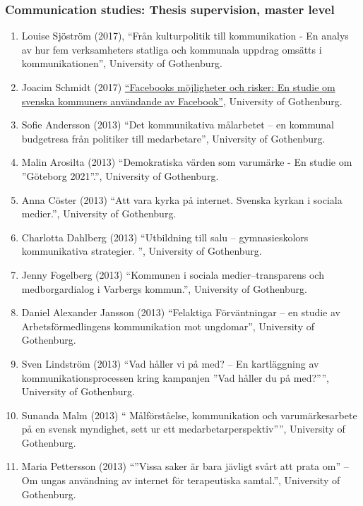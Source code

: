 \documentclass[a4paper,11pt,oneside]{article}
\begin{document}
             \subsubsection{Communication studies: Thesis supervision, master level}
             \begin{enumerate}
             \item Louise Sjöström (2017), ``Från kulturpolitik till kommunikation - En analys av hur fem verksamheters statliga och kommunala uppdrag omsätts i kommunikationen'', University of Gothenburg.
             \item Joacim Schmidt (2017) \href{https://gupea.ub.gu.se/bitstream/2077/52545/1/gupea_2077_52545_1.pdf}{``Facebooks möjligheter och risker: En studie om svenska kommuners användande av Facebook''}, University of Gothenburg.
             \item Sofie Andersson (2013) ``Det kommunikativa målarbetet – en kommunal budgetresa från politiker till medarbetare'', University of Gothenburg.
             \item Malin Arosilta (2013) ``Demokratiska värden som varumärke - En studie om ''Göteborg 2021''.'', University of Gothenburg.
             \item Anna Cöster (2013) ``Att vara kyrka på internet. Svenska kyrkan i sociala medier.'', University of Gothenburg.
             \item Charlotta Dahlberg (2013) ``Utbildning till salu – gymnasieskolors kommunikativa strategier. '', University of Gothenburg.
             \item Jenny Fogelberg (2013) ``Kommunen i sociala medier–transparens och medborgardialog i Varbergs kommun.'', University of Gothenburg.
             \item Daniel Alexander Jansson (2013) ``Felaktiga Förväntningar – en studie av Arbetsförmedlingens kommunikation mot ungdomar'', University of Gothenburg.
             \item Sven Lindström (2013) ``Vad håller vi på med? – En kartläggning av kommunikationsprocessen kring kampanjen ”Vad håller du på med?”'', University of Gothenburg.
             \item Sunanda Malm (2013) `` Målförståelse, kommunikation och varumärkesarbete på en svensk myndighet, sett ur ett medarbetarperspektiv'''', University of Gothenburg.
             \item Maria Pettersson (2013) ``''Vissa saker är bara jävligt svårt att prata om'' – Om ungas användning av internet för terapeutiska samtal.'', University of Gothenburg.

\end{enumerate}
\end{document}
